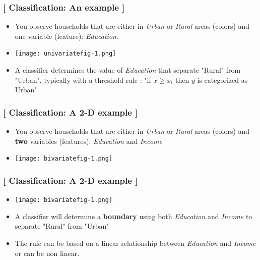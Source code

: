 \documentclass[xcolor=x11names,compress]{beamer}
\renewcommand{\(}{\begin{columns}}
\renewcommand{\)}{\end{columns}}
\newcommand{\<}[1]{\begin{column}{#1}}
\renewcommand{\>}{\end{column}}
\begin{document}
\begin{frame} %
\frametitle{\textcolor{brique}{[ Classification:  An example ]}}
\pause
\begin{itemize}[<+->]
  \item You observe households that are either in \textit{Urban} or \textit{Rural} areas (colors) and one variable (feature): \textit{Education}.
  \item[] \begin{center}\texttt{[image: univariatefig-1.png]} \end{center}
  \item A classifier determines the value of\textit{ Education} that separate "Rural" from  "Urban", typically
 with a threshold rule : "if $x \geq x_t$  then $y$ is categorized as Urban"
\end{itemize}
\end{frame}

\begin{frame} %
\frametitle{\textcolor{brique}{[ Classification:  A 2-D example ]}}
\pause
\begin{itemize}[<+->]
  \item You observe households that are either in \textit{Urban} or \textit{Rural} areas (colors) and \textbf{two} variables (features): \textit{Education} and \textit{Income}
  \item[] \begin{center}\texttt{[image: bivariatefig-1.png]} \end{center}
\end{itemize}
\end{frame}

\begin{frame} %
\frametitle{\textcolor{brique}{[ Classification:  A 2-D example ]}}
\pause
\begin{itemize}[<+->]
  \item[] \begin{center}\texttt{[image: bivariatefig-1.png]} \end{center}
   \item A classifier will determine a\textbf{ boundary} using both \textit{Education}  and \textit{Income} to separate "Rural" from "Urban"
  \item The rule can be based on a linear relationship between \textit{Education}  and \textit{Income} or can be non linear.
\end{itemize}
\end{frame}
\end{document}
